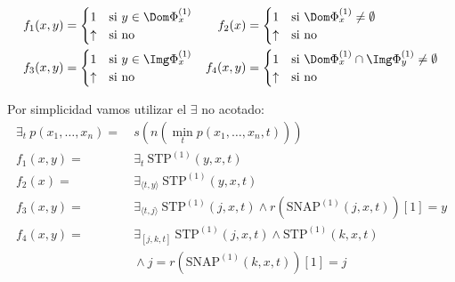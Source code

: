 \documentclass[fleqn, 11pt]{article}
\newcommand{\indef}{\uparrow}
\newcommand{\STP}[1][n]{\text{STP}^{(#1)}}
\newcommand{\SNAP}[1][n]{\text{SNAP}^{(#1)}}
\begin{document}
\begin{align*}
	f_1(x, y) &=
	\begin{cases}
		1      & \text{si } y \in \Dom \Phi^{(1)}_x \\
		\indef & \text{si no}
	\end{cases} &
	f_2(x) &=
	\begin{cases}
		1      & \text{si } \Dom \Phi^{(1)}_x \neq \emptyset \\
		\indef & \text{si no}
	\end{cases} \\
	f_3(x, y) &=
	\begin{cases}
		1      & \text{si } y \in \Img \Phi^{(1)}_x \\
		\indef & \text{si no}
	\end{cases} &
	f_4(x, y) &=
	\begin{cases}
		1      & \text{si } \Dom \Phi^{(1)}_x \cap \Img \Phi^{(1)}_y
		                    \neq \emptyset \\
		\indef & \text{si no}
	\end{cases}
\end{align*}

Por simplicidad vamos utilizar el $\exists$ no acotado:
\begin{align*}
	\exists_t\ p(x_1, \dots, x_n) =&\ s(n(\min_t p(x_1, \dots, x_n, t))) \\
	f_1(x, y) =&\ \exists_t\ \STP[1](y, x, t) \\
	f_2(x)    =&\ \exists_{\langle t, y \rangle}\ \STP[1](y, x, t) \\
	f_3(x, y) =&\ \exists_{\langle t, j \rangle}\ \STP[1](j, x, t)
		\land r(\SNAP[1](j, x, t))[1] = y \\
	f_4(x, y) =&\ \exists_{[j, k, t]}\ \STP[1](j, x, t)
		\land \STP[1](k, x, t) \\
		&\ \land j = r(\SNAP[1](k, x, t))[1] = j
\end{align*}
\end{document}
